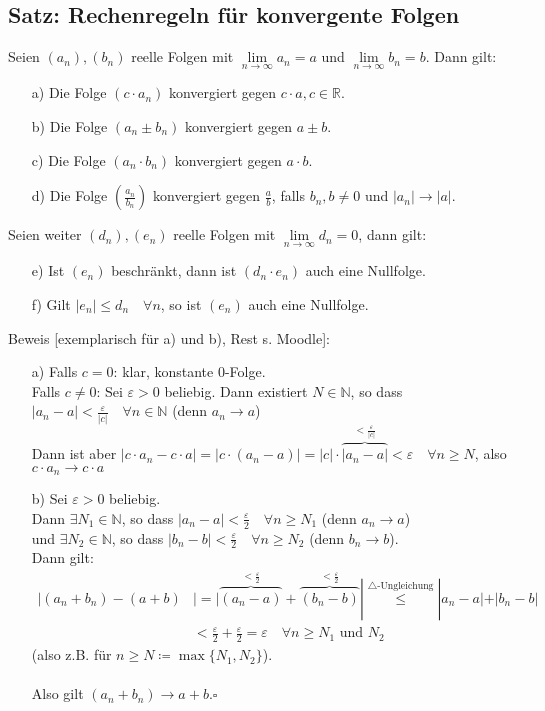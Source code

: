 \documentclass[12pt, titlepage]{article}
\newcommand{\R}{\mathds{R}}
\newcommand{\N}{\mathds{N}}
\newcommand{\infn}{n\rightarrow\infty}
\renewcommand{\>}{\rightarrow}
\renewcommand{\*}{\cdot}
\renewcommand{\epsilon}{\varepsilon}
\begin{document}
	\subsection{Satz: Rechenregeln für konvergente Folgen}
	Seien $(a_n), (b_n)$ reelle Folgen mit $\lim\limits_{\infn}a_n=a$ und $\lim\limits_{\infn}b_n=b$. Dann gilt:
	\begin{itemize}
		\item[a)] Die Folge $(c\*a_n)$ konvergiert gegen $c\*a, c\in\R$.
		\item[b)] Die Folge $(a_n\pm b_n)$ konvergiert gegen $a\pm b$.
		\item[c)] Die Folge $(a_n\*b_n)$ konvergiert gegen $a\*b$.
		\item[d)] Die Folge $(\frac{a_n}{b_n})$ konvergiert gegen $\frac{a}{b}$, falls $b_n, b\neq0$ und $|a_n|\>|a|$.
	\end{itemize}
	Seien weiter $(d_n), (e_n)$ reelle Folgen mit $\lim\limits_{\infn}d_n=0$, dann gilt:
	\begin{itemize}
		\item[e)] Ist $(e_n)$ beschränkt, dann ist $(d_n\*e_n)$ auch eine Nullfolge.
		\item[f)] Gilt $|e_n|\leq d_n\quad\forall n$, so ist $(e_n)$ auch eine Nullfolge.
	\end{itemize}
	Beweis [exemplarisch für a) und b), Rest s. Moodle]:\\
	\begin{itemize}
		\item[a)] Falls $c=0$: klar, konstante 0-Folge.\\
		Falls $c\neq 0$: Sei $\epsilon>0$ beliebig. Dann existiert $N\in\N$, so dass $|a_n-a|<\frac{\epsilon}{|c|}\quad\forall n\in\N$ (denn $a_n\> a$)\\
		Dann ist aber $|c\*a_n-c\*a|=|c\*(a_n-a)|=|c|\*\overbrace{|a_n-a|}^{<\frac{\epsilon}{|c|}}<\epsilon\quad\forall n\geq N$, also $c\*a_n\> c\*a$
		\item[b)] Sei $\epsilon>0$ beliebig.\\
		Dann $\exists N_1\in\N$, so dass $|a_n-a|<\frac{\epsilon}{2}\quad\forall n\geq N_1$ (denn $a_n\> a$)\\
		und $\exists N_2\in\N$, so dass $|b_n-b|<\frac{\epsilon}{2}\quad\forall n\geq N_2$ (denn $b_n\> b$).\\
		Dann gilt:
		\begin{align*}
			|(a_n+b_n)-(a+b)&|=|\overbrace{(a_n-a)}^{<\frac{\epsilon}{2}}+\overbrace{(b_n-b)}^{<\frac{\epsilon}{2}}|\overset{\triangle\textrm{-Ungleichung}}{\leq}|a_n-a|+|b_n-b|\\
			&<\frac{\epsilon}{2}+\frac{\epsilon}{2}=\epsilon\quad\forall n\geq N_1\textrm{ und }N_2
		\end{align*}
		(also z.B. für $n\geq N\coloneqq\max\{N_1,N_2\}$).\\
		\\
		Also gilt $(a_n+b_n)\> a+b$.\hfill$\square$
	\end{itemize}
\end{document}
